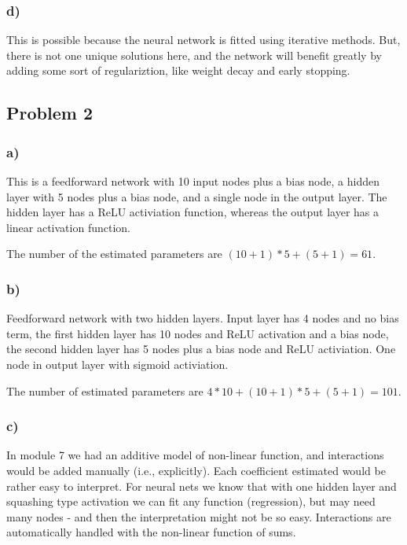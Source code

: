 \documentclass[]{article}
\begin{document}
\hypertarget{d}{%
\subsubsection{d)}\label{d}}

This is possible because the neural network is fitted using iterative
methods. But, there is not one unique solutions here, and the network
will benefit greatly by adding some sort of regulariztion, like weight
decay and early stopping.

\hypertarget{problem-2}{%
\subsection{Problem 2}\label{problem-2}}

\hypertarget{a-1}{%
\subsubsection{a)}\label{a-1}}

This is a feedforward network with 10 input nodes plus a bias node, a
hidden layer with 5 nodes plus a bias node, and a single node in the
output layer. The hidden layer has a ReLU activiation function, whereas
the output layer has a linear activation function.

The number of the estimated parameters are \((10+1)*5+(5+1)=61\).

\hypertarget{b-1}{%
\subsubsection{b)}\label{b-1}}

Feedforward network with two hidden layers. Input layer has 4 nodes and
no bias term, the first hidden layer has 10 nodes and ReLU activation
and a bias node, the second hidden layer has 5 nodes plus a bias node
and ReLU activiation. One node in output layer with sigmoid activiation.

The number of estimated parameters are \(4*10+(10+1)*5+(5+1)=101\).

\hypertarget{c-1}{%
\subsubsection{c)}\label{c-1}}

In module 7 we had an additive model of non-linear function, and
interactions would be added manually (i.e., explicitly). Each
coefficient estimated would be rather easy to interpret. For neural nets
we know that with one hidden layer and squashing type activation we can
fit any function (regression), but may need many nodes - and then the
interpretation might not be so easy. Interactions are automatically
handled with the non-linear function of sums.
\end{document}
